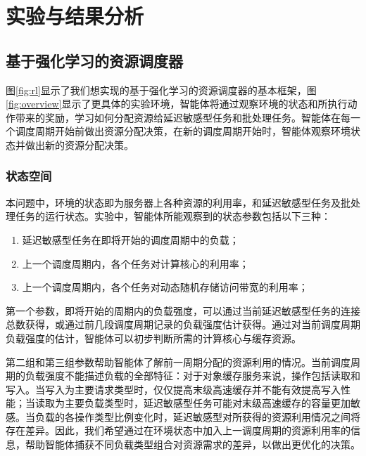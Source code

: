 \chapter{实验与结果分析}

\section{基于强化学习的资源调度器}
图\ref{fig:rl}显示了我们想实现的基于强化学习的资源调度器的基本框架，图\ref{fig:overview}显示了更具体的实验环境，智能体将通过观察环境的状态和所执行动作带来的奖励，学习如何分配资源给延迟敏感型任务和批处理任务。智能体在每一个调度周期开始前做出资源分配决策，在新的调度周期开始时，智能体观察环境状态并做出新的资源分配决策。


\subsection{状态空间}
本问题中，环境的状态即为服务器上各种资源的利用率，和延迟敏感型任务及批处理任务的运行状态。实验中，智能体所能观察到的状态参数包括以下三种：
\begin{enumerate}
  \item 延迟敏感型任务在即将开始的调度周期中的负载；
  \item 上一个调度周期内，各个任务对计算核心的利用率；
  \item 上一个调度周期内，各个任务对动态随机存储访问带宽的利用率；
\end{enumerate}

\vspace{1em}
第一个参数，即将开始的周期内的负载强度，可以通过当前延迟敏感型任务的连接总数获得，或通过前几段调度周期记录的负载强度估计获得。通过对当前调度周期负载强度的估计，智能体可以初步判断所需的计算核心与缓存资源。

第二组和第三组参数帮助智能体了解前一周期分配的资源利用的情况。当前调度周期的负载强度不能描述负载的全部特征：对于对象缓存服务来说，操作包括读取和写入。当写入为主要请求类型时，仅仅提高末级高速缓存并不能有效提高写入性能；当读取为主要负载类型时，延迟敏感型任务可能对末级高速缓存的容量更加敏感。当负载的各操作类型比例变化时，延迟敏感型对所获得的资源利用情况之间将存在差异。因此，我们希望通过在环境状态中加入上一调度周期的资源利用率的信息，帮助智能体捕获不同负载类型组合对资源需求的差异，以做出更优化的决策。

